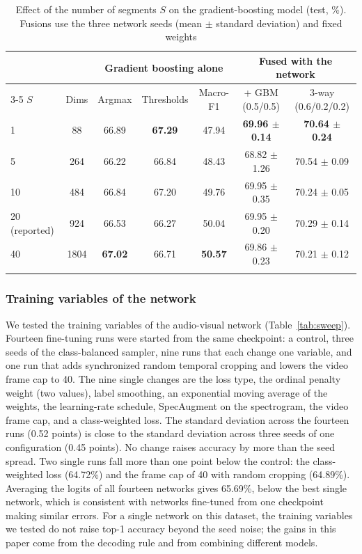 \documentclass[pdflatex,iicol,sn-basic]{sn-jnl}
\begin{document}
\begin{table}[t]
\caption{Effect of the number of segments $S$ on the gradient-boosting model (test, \%). Fusions use the three network seeds (mean $\pm$ standard deviation) and fixed weights}\label{tab:segments}
\begin{tabular*}{\textwidth}{@{\extracolsep\fill}lcccccc}
\toprule
& & \multicolumn{3}{c}{Gradient boosting alone} & \multicolumn{2}{c}{Fused with the network}\\
\cmidrule{3-5}\cmidrule{6-7}
$S$ & Dims & Argmax & Thresholds & Macro-F1 & + GBM (0.5/0.5) & 3-way (0.6/0.2/0.2)\\
\midrule
1 & 88 & 66.89 & \textbf{67.29} & 47.94 & \textbf{69.96 $\pm$ 0.14} & \textbf{70.64 $\pm$ 0.24}\\
5 & 264 & 66.22 & 66.84 & 48.43 & 68.82 $\pm$ 1.26 & 70.54 $\pm$ 0.09\\
10 & 484 & 66.84 & 67.20 & 49.76 & 69.95 $\pm$ 0.35 & 70.24 $\pm$ 0.05\\
20 (reported) & 924 & 66.53 & 66.27 & 50.04 & 69.95 $\pm$ 0.20 & 70.29 $\pm$ 0.14\\
40 & 1804 & \textbf{67.02} & 66.71 & \textbf{50.57} & 69.86 $\pm$ 0.23 & 70.21 $\pm$ 0.12\\
\botrule
\end{tabular*}
\end{table}

\subsubsection{Training variables of the network}\label{sec:abl_sweep}

We tested the training variables of the audio-visual network (Table~\ref{tab:sweep}). Fourteen fine-tuning runs were started from the same checkpoint: a control, three seeds of the class-balanced sampler, nine runs that each change one variable, and one run that adds synchronized random temporal cropping and lowers the video frame cap to 40. The nine single changes are the loss type, the ordinal penalty weight (two values), label smoothing, an exponential moving average of the weights, the learning-rate schedule, SpecAugment \citep{park2019specaugment} on the spectrogram, the video frame cap, and a class-weighted loss. The standard deviation across the fourteen runs (0.52 points) is close to the standard deviation across three seeds of one configuration (0.45 points). No change raises accuracy by more than the seed spread. Two single runs fall more than one point below the control: the class-weighted loss (64.72\%) and the frame cap of 40 with random cropping (64.89\%). Averaging the logits of all fourteen networks gives 65.69\%, below the best single network, which is consistent with networks fine-tuned from one checkpoint making similar errors. For a single network on this dataset, the training variables we tested do not raise top-1 accuracy beyond the seed noise; the gains in this paper come from the decoding rule and from combining different models.
\end{document}
